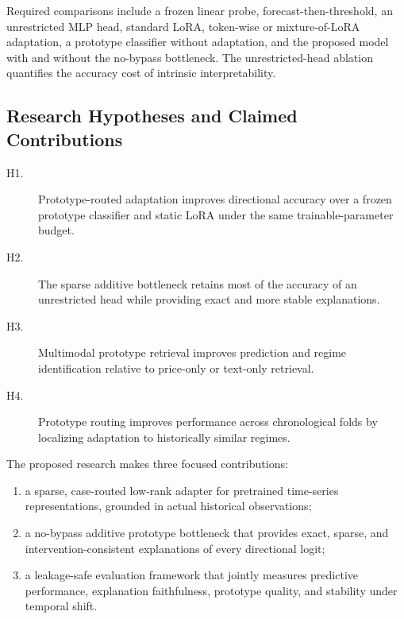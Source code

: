 \documentclass[11pt]{article}
\begin{document}
Required comparisons include a frozen linear probe, forecast-then-threshold,
an unrestricted MLP head, standard LoRA, token-wise or mixture-of-LoRA
adaptation, a prototype classifier without adaptation, and the proposed model
with and without the no-bypass bottleneck. The unrestricted-head ablation
quantifies the accuracy cost of intrinsic interpretability.

\subsection{Research Hypotheses and Claimed Contributions}

\begin{description}
    \item[H1.]
    Prototype-routed adaptation improves directional accuracy over a frozen
    prototype classifier and static LoRA under the same trainable-parameter
    budget.

    \item[H2.]
    The sparse additive bottleneck retains most of the accuracy of an
    unrestricted head while providing exact and more stable explanations.

    \item[H3.]
    Multimodal prototype retrieval improves prediction and regime
    identification relative to price-only or text-only retrieval.

    \item[H4.]
    Prototype routing improves performance across chronological folds by
    localizing adaptation to historically similar regimes.
\end{description}

The proposed research makes three focused contributions:

\begin{enumerate}
    \item a sparse, case-routed low-rank adapter for pretrained time-series
    representations, grounded in actual historical observations;

    \item a no-bypass additive prototype bottleneck that provides exact,
    sparse, and intervention-consistent explanations of every directional
    logit;

    \item a leakage-safe evaluation framework that jointly measures predictive
    performance, explanation faithfulness, prototype quality, and stability
    under temporal shift.
\end{enumerate}
\end{document}
